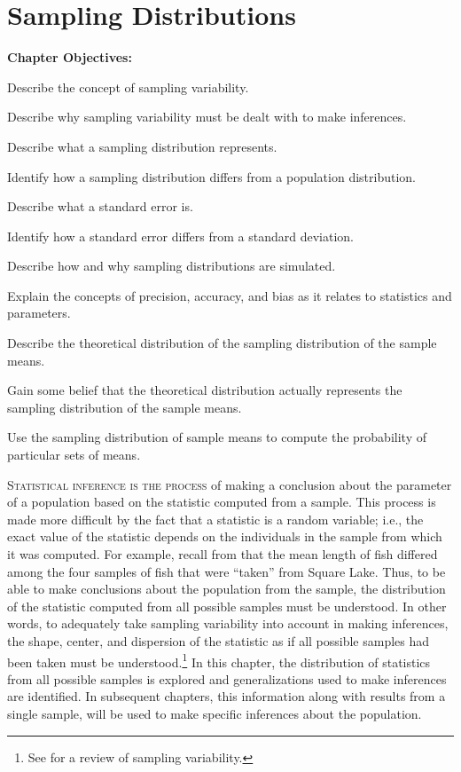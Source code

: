 \documentclass[10pt,openany]{book}\usepackage[]{graphicx}\usepackage[]{color}
\begin{document}
\chapter{Sampling Distributions} \label{chap:SamplingDist}
\begin{ChapObj}{\boxwidth}
  \textbf{Chapter Objectives:}
  \begin{Enumerate}
    \item Describe the concept of sampling variability.
    \item Describe why sampling variability must be dealt with to make inferences.
    \item Describe what a sampling distribution represents.
    \item Identify how a sampling distribution differs from a population distribution.
    \item Describe what a standard error is.
    \item Identify how a standard error differs from a standard deviation.
    \item Describe how and why sampling distributions are simulated.
    \item Explain the concepts of precision, accuracy, and bias as it relates to statistics and parameters.
    \item Describe the theoretical distribution of the sampling distribution of the sample means.
    \item Gain some belief that the theoretical distribution actually represents the sampling distribution of the sample means.
    \item Use the sampling distribution of sample means to compute the probability of particular sets of means.
  \end{Enumerate}
\end{ChapObj}

\minitoc
\newpage

\lettrine{S}{tatistical inference is the process} of making a conclusion about the parameter of a population based on the statistic computed from a sample.  This process is made more difficult by the fact that a statistic is a random variable; i.e., the exact value of the statistic depends on the individuals in the sample from which it was computed.  For example, recall from  that the mean length of fish differed among the four samples of fish that were ``taken'' from Square Lake.  Thus, to be able to make conclusions about the population from the sample, the distribution of the statistic computed from all possible samples must be understood.  In other words, to adequately take sampling variability into account in making inferences, the shape, center, and dispersion of the statistic as if all possible samples had been taken must be understood.\footnote{See  for a review of sampling variability.}  In this chapter, the distribution of statistics from all possible samples is explored and generalizations used to make inferences are identified.  In subsequent chapters, this information along with results from a single sample, will be used to make specific inferences about the population.
\end{document}
